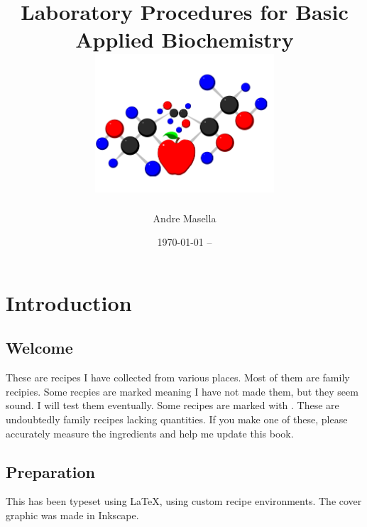 \documentclass{book}
\begin{document}
\titlelabel{}
\pagestyle{fancy}
\fancyhf{}
\renewcommand{\chaptermark}[1]{\markboth{#1}{}}
 
\fancyhf{}
\fancyhead[LE,RO]{\thepage}
\fancyhead[RE]{\textit{\nouppercase{\leftmark}}}
\fancyhead[LO]{}

\thispagestyle{plain}

\title{Laboratory Procedures for Basic Applied Biochemistry \\
\includegraphics[width=0.5\textwidth,angle=-90]{CoverLogo} 
}
\author{ Andre Masella }
\date{\today{} -- }
\maketitle

\tableofcontents

\chapter{Introduction}

\section{Welcome}

These are recipes I have collected from various places. Most of them are
family recipies. Some recpies are marked \UNTESTED meaning I have not
made them, but they seem sound.  I will test them eventually. Some recipes are marked with \FIXME{}. These are undoubtedly family recipes lacking quantities. If you make one of these, please accurately measure the ingredients and help me update this book.\par

\section{Preparation}

This has been typeset using \LaTeX{}, using custom recipe environments.
The cover graphic was made in Inkscape.\par
\end{document}
